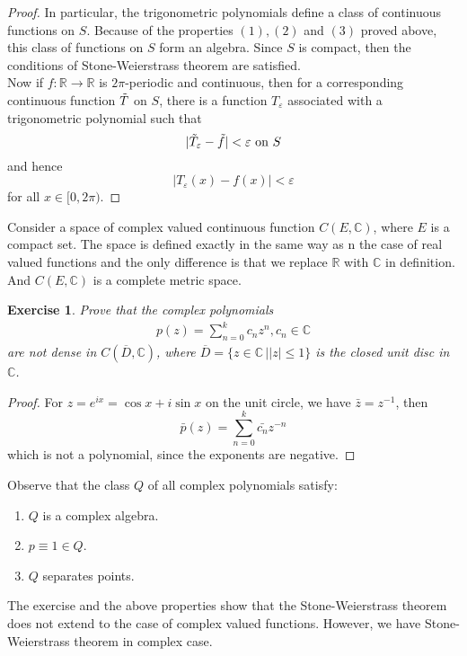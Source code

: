 \documentclass[12pt,leqno]{amsart}
\newtheorem{exercise}{Exercise}[section]
\theoremstyle{definition}
\numberwithin{equation}{subsection}
\begin{document}
\begin{proof}
In particular, the trigonometric polynomials define a class of continuous functions on $S$. Because of the properties $(1),(2)$ and $(3)$ proved above, this class of functions on $S$ form an algebra. Since $S$ is compact, then the conditions of Stone-Weierstrass theorem are satisfied. \\

Now if $f:\mathbb{R}\to\mathbb{R}$ is $2\pi$-periodic and continuous, then for a corresponding continuous function $\Tilde{T}$ on $S$, there is a function $T_\varepsilon$ associated with a trigonometric polynomial such that 
$$|\Tilde{T}_\varepsilon - \Tilde{f}| < \varepsilon \,\, \text{on} \,\, S$$
and hence 
$$|T_\varepsilon(x) - f(x)| < \varepsilon$$
for all $x\in[0,2\pi)$.
\end{proof}

\medskip

Consider a space of complex valued continuous function $C(E,\mathbb{C})$, where $E$ is a compact set. The space is defined exactly in the same way as n the case of real valued functions and the only difference is that we replace $\mathbb{R}$ with $\mathbb{C}$ in definition. And $C(E,\mathbb{C})$ is a complete metric space. 

\begin{exercise}
Prove that the complex polynomials 
\begin{align*}
    p(z) = \sum^k_{n=0}c_n z^n, c_n\in\mathbb{C}
\end{align*}
are not dense in $C(\overline{D},\mathbb{C})$, where $\overline{D} = \{z\in \mathbb{C} \,| \left|z\right|\leq 1\}$ is the closed unit disc in $\mathbb{C}$.
\end{exercise}
\begin{proof}
For $z = e^{ix} = \cos x + i\sin x$ on the unit circle, we have $\bar{z} = z^{-1}$, then $$\bar{p}(z) = \sum^k_{n=0}\bar{c_n} z^{-n}$$
which is not a polynomial, since the exponents are negative.
\end{proof}

Observe that the class $Q$ of all complex polynomials satisfy:
\begin{enumerate}
    \item $Q$ is a complex algebra.
    \item $p\equiv 1 \in Q$.
    \item $Q$ separates points.
\end{enumerate}
The exercise and the above properties show that the Stone-Weierstrass theorem does not extend to the case of complex valued functions. However, we have Stone-Weierstrass theorem in complex case.
\end{document}
